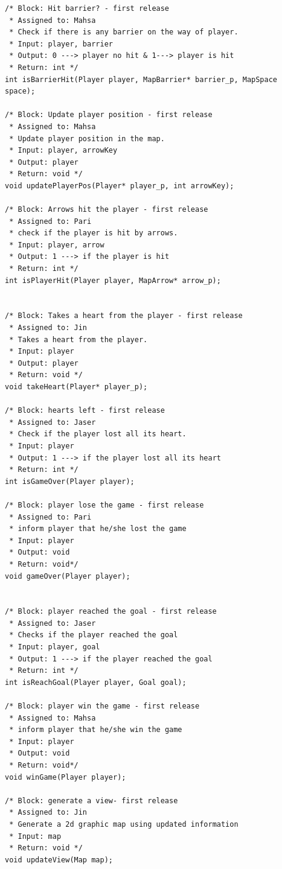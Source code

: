 \begin{verbatim}
/* Block: Hit barrier? - first release
 * Assigned to: Mahsa
 * Check if there is any barrier on the way of player.
 * Input: player, barrier
 * Output: 0 ---> player no hit & 1---> player is hit
 * Return: int */
int isBarrierHit(Player player, MapBarrier* barrier_p, MapSpace space);

/* Block: Update player position - first release
 * Assigned to: Mahsa
 * Update player position in the map.
 * Input: player, arrowKey
 * Output: player 
 * Return: void */
void updatePlayerPos(Player* player_p, int arrowKey);

/* Block: Arrows hit the player - first release
 * Assigned to: Pari
 * check if the player is hit by arrows.
 * Input: player, arrow
 * Output: 1 ---> if the player is hit
 * Return: int */
int isPlayerHit(Player player, MapArrow* arrow_p);


/* Block: Takes a heart from the player - first release
 * Assigned to: Jin
 * Takes a heart from the player.
 * Input: player
 * Output: player
 * Return: void */
void takeHeart(Player* player_p);

/* Block: hearts left - first release
 * Assigned to: Jaser
 * Check if the player lost all its heart.
 * Input: player
 * Output: 1 ---> if the player lost all its heart
 * Return: int */
int isGameOver(Player player);

/* Block: player lose the game - first release
 * Assigned to: Pari
 * inform player that he/she lost the game
 * Input: player
 * Output: void
 * Return: void*/
void gameOver(Player player);


/* Block: player reached the goal - first release
 * Assigned to: Jaser
 * Checks if the player reached the goal
 * Input: player, goal
 * Output: 1 ---> if the player reached the goal
 * Return: int */
int isReachGoal(Player player, Goal goal);

/* Block: player win the game - first release
 * Assigned to: Mahsa
 * inform player that he/she win the game
 * Input: player
 * Output: void
 * Return: void*/
void winGame(Player player);

/* Block: generate a view- first release
 * Assigned to: Jin
 * Generate a 2d graphic map using updated information
 * Input: map
 * Return: void */
void updateView(Map map);

\end{verbatim}